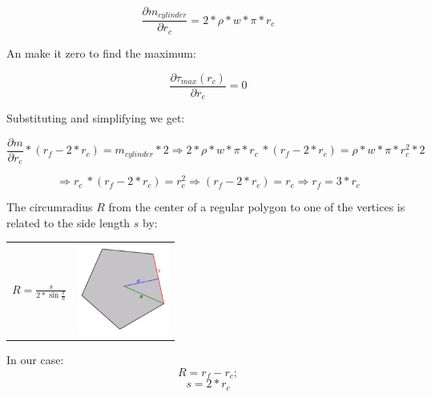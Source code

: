 \[ \frac{\partial  m_{cylinder}}{\partial r_c} = 2 * \rho * w * \pi *  r_c\]

An make it zero to find the maximum:

\[\frac{\partial \tau _{max} (r_c)}{\partial r_c} = 0\]

Substituting and simplifying we get:

\[\frac{\partial m}{\partial r_c} * (r_f - 2 * r_c) =   m_{cylinder} * 2 \Rightarrow 2 * \rho * w * \pi *  r_c\ * (r_f - 2 * r_c) = \rho * w * \pi * r_c^2 * 2 \]

\[ \Rightarrow r_c\ * (r_f - 2 * r_c) =  r_c^2 \Rightarrow (r_f - 2 * r_c) =  r_c \Rightarrow \boxed{r_f = 3 * r_c}\]


The circumradius $R$ from the center of a regular polygon to one of the vertices is related to the side length $s$ by:

\begin{center}
	\begin{tabular}{ c  c }
		\(\displaystyle R=\frac {s}{2* \sin{\frac {\pi} {n}}} \)
		& 
		\includegraphics[width=3cm]{img/PolygonParameters.png}
	\end{tabular}
\end{center}

In our case:
\[ R = r_f - r_c; \]
\[ s = 2 * r_c\]

